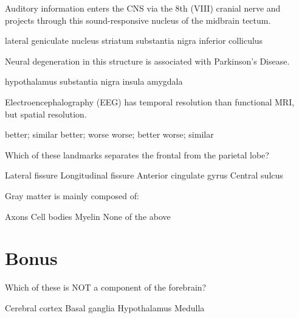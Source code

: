 \documentclass[answers]{exam}
\begin{document}
\begin{questions}
\question Auditory information enters the CNS via the 8th (VIII) cranial nerve and projects through this sound-responsive nucleus of the midbrain tectum.
\begin{choices}
\choice lateral geniculate nucleus
\choice striatum
\choice substantia nigra
\correctchoice inferior colliculus
\end{choices}

\question Neural degeneration in this structure is associated with Parkinson’s Disease.
\begin{choices}
\choice hypothalamus
\correctchoice substantia nigra
\choice insula
\choice amygdala
\end{choices}

\question Electroencephalography (EEG) has \fillin temporal resolution than functional MRI, \\
but \fillin spatial resolution.
\begin{choices}
\choice better; similar
\correctchoice better; worse
\choice worse; better
\choice worse; similar
\end{choices}

\question Which of these landmarks separates the frontal from the parietal lobe?
\begin{choices}
\choice Lateral fissure
\choice Longitudinal fissure
\choice Anterior cingulate gyrus
\correctchoice Central sulcus
\end{choices}

\question Gray matter is mainly composed of:
\begin{choices}
    \choice Axons
    \correctchoice Cell bodies
    \choice Myelin
    \choice None of the above
\end{choices}

\section{Bonus}
\question Which of these is NOT a component of the forebrain?
\begin{choices}
\choice Cerebral cortex
\choice Basal ganglia
\choice Hypothalamus
\correctchoice Medulla
\end{choices}	

\end{questions}
\end{document}
